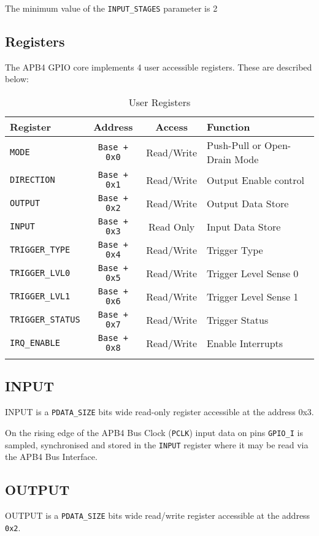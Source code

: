 The minimum value of the \texttt{INPUT\_STAGES} parameter is 2

\subsection{Registers}\label{registers}

The APB4 GPIO core implements 4 user accessible registers. These are
described below:

\begin{longtable}[]{@{}lccl@{}}
\toprule
\textbf{Register} & \textbf{Address} & \textbf{Access} & \textbf{Function}\tabularnewline
\midrule
\endhead
\texttt{MODE} & \texttt{Base + 0x0} & Read/Write & Push-Pull or Open-Drain Mode\tabularnewline
\texttt{DIRECTION} & \texttt{Base + 0x1} & Read/Write & Output Enable control\tabularnewline
\texttt{OUTPUT} & \texttt{Base + 0x2} & Read/Write & Output Data Store\tabularnewline
\texttt{INPUT} & \texttt{Base + 0x3} & Read Only & Input Data Store\tabularnewline
\texttt{TRIGGER\_TYPE} & \texttt{Base + 0x4} & Read/Write & Trigger Type\tabularnewline
\texttt{TRIGGER\_LVL0} & \texttt{Base + 0x5} & Read/Write & Trigger Level Sense 0\tabularnewline
\texttt{TRIGGER\_LVL1} & \texttt{Base + 0x6} & Read/Write & Trigger Level Sense 1\tabularnewline
\texttt{TRIGGER\_STATUS} & \texttt{Base + 0x7} & Read/Write & Trigger Status\tabularnewline
\texttt{IRQ\_ENABLE} & \texttt{Base + 0x8} & Read/Write & Enable Interrupts\tabularnewline
\bottomrule
\caption{User Registers}
\end{longtable}

\subsection{INPUT}\label{input}

INPUT is a \texttt{PDATA\_SIZE} bits wide read-only register accessible at the
address 0x3.

On the rising edge of the APB4 Bus Clock (\texttt{PCLK}) input data on pins
\texttt{GPIO\_I} is sampled, synchronised and stored in the \texttt{INPUT} register where
it may be read via the APB4 Bus Interface.

\subsection{OUTPUT}\label{output}

OUTPUT is a \texttt{PDATA\_SIZE} bits wide read/write register accessible at the
address \texttt{0x2}.

